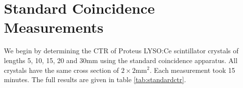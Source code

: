 \section{Standard Coincidence Measurements}
We begin by determining the CTR of Proteus LYSO:Ce scintillator crystals of lengths 5, 10, 15, 20 and 30mm using the standard coincidence apparatus. All crystals have the same cross section of $2\times2$mm$^2$. Each measurement took 15 minutes. The full results are given in table \ref{tab:standardctr}.


